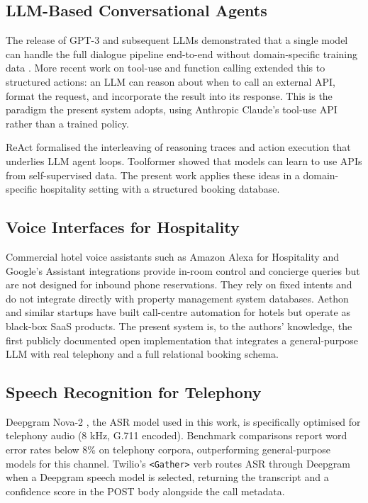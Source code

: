 \documentclass[conference]{IEEEtran}
\begin{document}
\subsection{LLM-Based Conversational Agents}

The release of GPT-3 and subsequent LLMs demonstrated that a single model can
handle the full dialogue pipeline end-to-end without domain-specific training
data \cite{brown2020language}. More recent work on tool-use and function calling
\cite{schick2023toolformer, openai2023functioncalling} extended this to
structured actions: an LLM can reason about when to call an external API,
format the request, and incorporate the result into its response. This is the
paradigm the present system adopts, using Anthropic Claude's tool-use API
\cite{anthropic2024claude} rather than a trained policy.

ReAct \cite{yao2022react} formalised the interleaving of reasoning traces and
action execution that underlies LLM agent loops. Toolformer
\cite{schick2023toolformer} showed that models can learn to use APIs from
self-supervised data. The present work applies these ideas in a
domain-specific hospitality setting with a structured booking database.

\subsection{Voice Interfaces for Hospitality}

Commercial hotel voice assistants such as Amazon Alexa for Hospitality and
Google's Assistant integrations provide in-room control and concierge queries
but are not designed for inbound phone reservations. They rely on fixed intents
and do not integrate directly with property management system databases.
Aethon \cite{aethon2022} and similar startups have built call-centre automation
for hotels but operate as black-box SaaS products. The present system is, to
the authors' knowledge, the first publicly documented open implementation that
integrates a general-purpose LLM with real telephony and a full relational
booking schema.

\subsection{Speech Recognition for Telephony}

Deepgram Nova-2 \cite{deepgram2023nova2}, the ASR model used in this work,
is specifically optimised for telephony audio (8 kHz, G.711 encoded). Benchmark
comparisons report word error rates below 8\% on telephony corpora, outperforming
general-purpose models for this channel. Twilio's \texttt{<Gather>} verb
routes ASR through Deepgram when a Deepgram speech model is selected, returning
the transcript and a confidence score in the POST body alongside the call
metadata.
\end{document}
